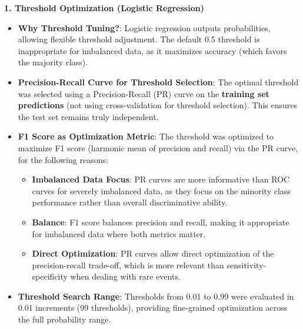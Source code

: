 \documentclass[12pt,a4paper]{article}
\begin{document}
\textbf{1. Threshold Optimization (Logistic Regression)}
\begin{itemize}
    \item \textbf{Why Threshold Tuning?}: Logistic regression outputs probabilities, allowing flexible threshold adjustment. The default 0.5 threshold is inappropriate for imbalanced data, as it maximizes accuracy (which favors the majority class).
    \item \textbf{Precision-Recall Curve for Threshold Selection}: The optimal threshold was selected using a Precision-Recall (PR) curve on the \textbf{training set predictions} (not using cross-validation for threshold selection). This ensures the test set remains truly independent.
    \item \textbf{F1 Score as Optimization Metric}: The threshold was optimized to maximize F1 score (harmonic mean of precision and recall) via the PR curve, for the following reasons:
    \begin{itemize}
        \item \textbf{Imbalanced Data Focus}: PR curves are more informative than ROC curves for severely imbalanced data, as they focus on the minority class performance rather than overall discriminative ability.
        \item \textbf{Balance}: F1 score balances precision and recall, making it appropriate for imbalanced data where both metrics matter.
        \item \textbf{Direct Optimization}: PR curves allow direct optimization of the precision-recall trade-off, which is more relevant than sensitivity-specificity when dealing with rare events.
    \end{itemize}
    \item \textbf{Threshold Search Range}: Thresholds from 0.01 to 0.99 were evaluated in 0.01 increments (99 thresholds), providing fine-grained optimization across the full probability range.
\end{itemize}
\end{document}
